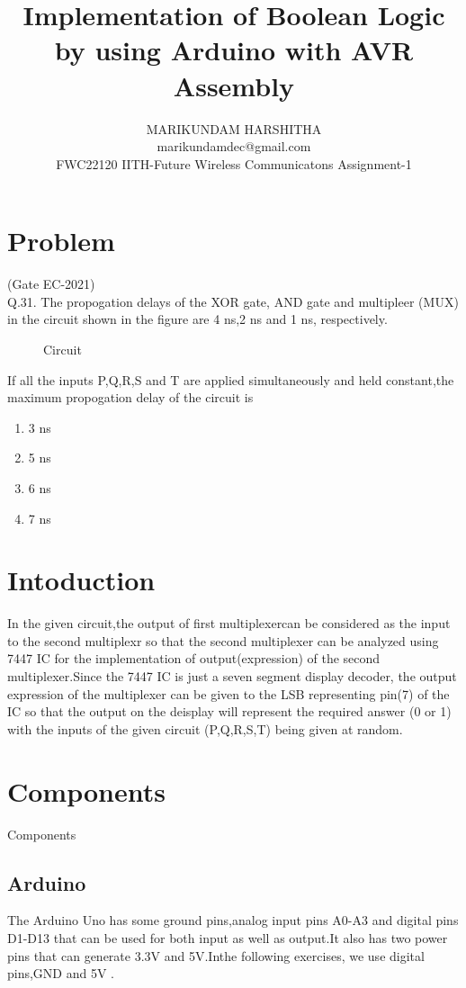 \documentclass{article}
\title{Implementation of Boolean Logic by using Arduino with AVR Assembly}
\author{MARIKUNDAM HARSHITHA\\marikundamdec@gmail.com\\FWC22120 IITH-Future Wireless Communicatons  Assignment-1}
\date{}
\begin{document}
\maketitle
\tableofcontents

\section{Problem}
		(Gate EC-2021)\\
Q.31. The propogation delays of the XOR gate, AND gate and multipleer (MUX) in the circuit shown in the figure are 4 ns,2 ns and 1 ns, respectively.\\
\begin{figure}[!h]
\begin{center}
\resizebox{0.5\columnwidth}{!}{

}
\end{center}
\caption{Circuit}
\label{fig:circuit}
\end{figure}
If all the inputs P,Q,R,S and T are applied simultaneously and held constant,the maximum propogation delay of the circuit is 
\begin{enumerate}
	\item 3 ns \item 5 ns \item 6 ns \item 7 ns
\end{enumerate}
\section{Intoduction}
	In the given circuit,the output of first multiplexercan be considered as the input to the second multiplexr so that the second multiplexer can be analyzed using 7447 IC for the implementation of output(expression) of the second multiplexer.Since the 7447 IC is just a seven segment display decoder, the output expression of the multiplexer can be given to the LSB representing pin(7) of the IC so that the output on the deisplay will represent the required answer (0 or 1) with the inputs of the given circuit (P,Q,R,S,T) being given at random.
\section{Components}
\begin{table}[!h]
\centering

\caption{Components}
\label{table:Components}
\end{table}
\subsection{Arduino} 
The Arduino Uno has some ground pins,analog input pins A0-A3 and digital pins D1-D13 that can be used for both input as well as output.It also has two power pins that can generate 3.3V and 5V.Inthe following exercises, we use digital pins,GND and 5V .
\end{document}
